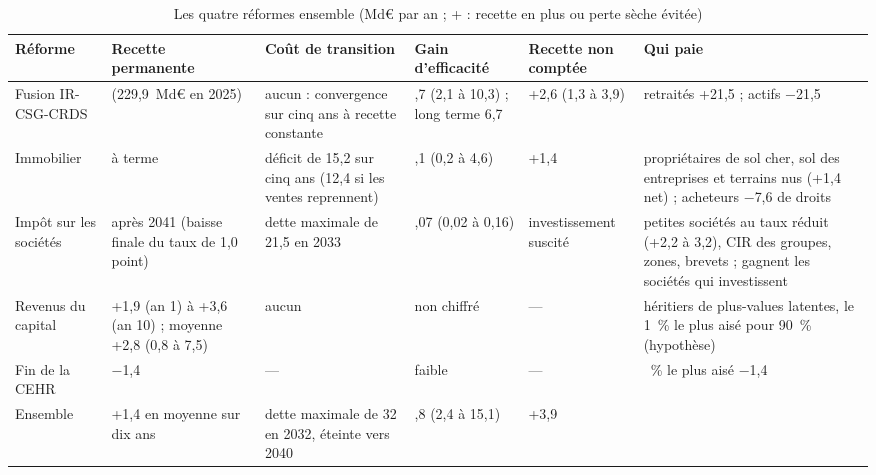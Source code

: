 \documentclass[11pt,a4paper]{article}
\begin{document}
\begin{table}[!htbp]\centering\scriptsize
\caption{Les quatre réformes ensemble (Md€ par an ; + : recette en plus ou perte sèche évitée)}\label{tab:ens_tableau}
\setlength{\tabcolsep}{3.5pt}
\begin{tabularx}{\linewidth}{@{}>{\raggedright\arraybackslash}p{1.75cm}>{\raggedright\arraybackslash}p{2.15cm}>{\raggedright\arraybackslash}p{2.15cm}>{\raggedright\arraybackslash}p{1.75cm}>{\raggedright\arraybackslash}p{1.95cm}>{\raggedright\arraybackslash}X@{}}
\toprule
Réforme & Recette permanente & Coût de transition & Gain d'efficacité & Recette non comptée & Qui paie \\
\midrule
Fusion IR-CSG-CRDS & 0 (229,9~Md€ en 2025) & aucun : convergence sur cinq ans à recette constante & 4,7 (2,1 à 10,3) ;
long terme 6,7 & +2,6 (1,3 à 3,9) & retraités +21,5 ; actifs $-$21,5 \\
Immobilier & 0 à terme & déficit de 15,2 sur cinq ans (12,4 si les ventes reprennent) & 2,1 (0,2 à 4,6) & +1,4 &
propriétaires de sol cher, sol des entreprises et terrains nus (+1,4 net) ; acheteurs $-$7,6 de droits \\
Impôt sur les sociétés & 0 après 2041 (baisse finale du taux de 1,0 point) & dette maximale de 21,5 en 2033 &
0,07 (0,02 à 0,16) & investissement suscité & petites sociétés au taux réduit (+2,2 à 3,2), CIR des groupes, zones,
brevets ; gagnent les sociétés qui investissent \\
Revenus du capital & +1,9 (an 1) à +3,6 (an 10) ; moyenne +2,8 (0,8 à 7,5) & aucun & non chiffré & --- & héritiers de
plus-values latentes, le 1~\% le plus aisé pour 90~\% (hypothèse) \\
Fin de la CEHR & $-$1,4 & --- & faible & --- & 1~\% le plus aisé $-$1,4 \\
\midrule
Ensemble & +1,4 en moyenne sur dix ans & dette maximale de 32 en 2032, éteinte vers 2040 & 6,8 (2,4 à 15,1) & +3,9 & \\
\bottomrule
\end{tabularx}
\par{}
\end{table}
\end{document}
